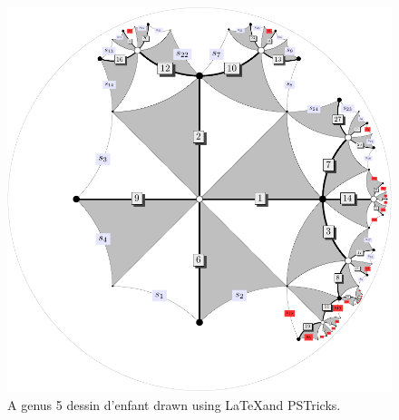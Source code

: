 \documentclass[a4paper]{adcv}
\begin{document}
\begin{figure}[ht]\label{fig:dessin}
  \centering
  \includegraphics[scale=0.4]{32S2-g5.pdf}
  \caption{
    A genus 5 dessin d'enfant drawn using \LaTeX and PSTricks.
  }
\end{figure}
\end{document}
